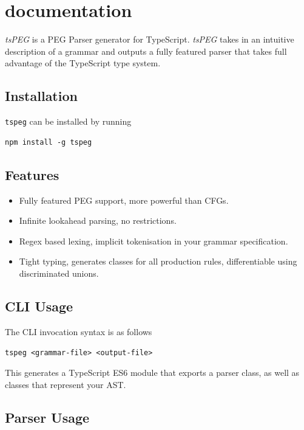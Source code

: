 \chapter{\tsPEG{} documentation}
\label{tspegdocs}

\emph{tsPEG} is a PEG Parser generator for TypeScript. \emph{tsPEG}
takes in an intuitive description of a grammar and outputs a fully
featured parser that takes full advantage of the TypeScript type system.

\section{Installation}\label{installation}

\texttt{tspeg} can be installed by running

\begin{verbatim}
npm install -g tspeg
\end{verbatim}

\section{Features}\label{features}

\begin{itemize}

\item
  Fully featured PEG support, more powerful than CFGs.
\item
  Infinite lookahead parsing, no restrictions.
\item
  Regex based lexing, implicit tokenisation in your grammar
  specification.
\item
  Tight typing, generates classes for all production rules,
  differentiable using discriminated unions.
\end{itemize}

\section{CLI Usage}\label{cli-usage}

The CLI invocation syntax is as follows

\texttt{tspeg\ \textless{}grammar-file\textgreater{}\ \textless{}output-file\textgreater{}}

This generates a TypeScript ES6 module that exports a parser class, as
well as classes that represent your AST.

\section{Parser Usage}\label{parser-usage}

